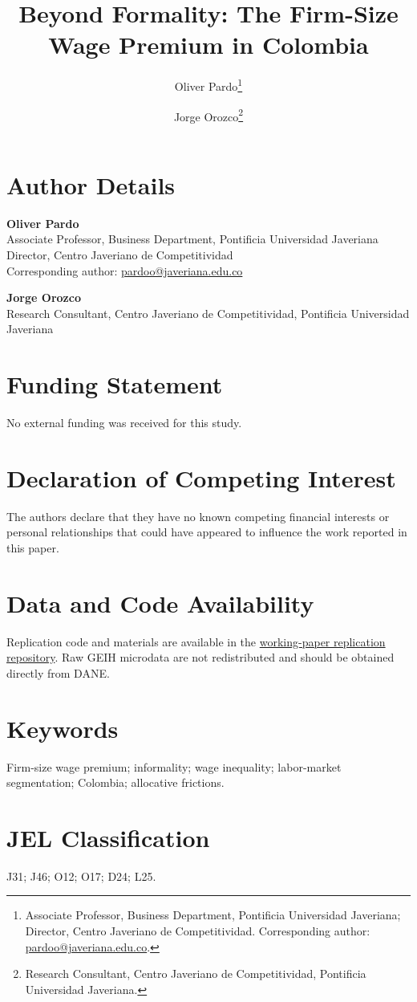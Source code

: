 \documentclass[12pt]{article}
\title{Beyond Formality: The Firm-Size Wage Premium in Colombia}
\author{
Oliver Pardo\thanks{Associate Professor, Business Department, Pontificia Universidad Javeriana; Director, Centro Javeriano de Competitividad. Corresponding author: \href{mailto:pardoo@javeriana.edu.co}{pardoo@javeriana.edu.co}.}
\and
Jorge Orozco\thanks{Research Consultant, Centro Javeriano de Competitividad, Pontificia Universidad Javeriana.}
}
\date{}
\begin{document}
\maketitle

\section*{Author Details}

\noindent\textbf{Oliver Pardo}\\
Associate Professor, Business Department, Pontificia Universidad Javeriana\\
Director, Centro Javeriano de Competitividad\\
Corresponding author: \href{mailto:pardoo@javeriana.edu.co}{pardoo@javeriana.edu.co}

\vspace{0.7cm}

\noindent\textbf{Jorge Orozco}\\
Research Consultant, Centro Javeriano de Competitividad, Pontificia Universidad Javeriana

\section*{Funding Statement}

No external funding was received for this study.

\section*{Declaration of Competing Interest}

The authors declare that they have no known competing financial interests or personal relationships that could have appeared to influence the work reported in this paper.

\section*{Data and Code Availability}

Replication code and materials are available in the
\href{https://github.com/Kin-George/CJC-Monitor/tree/working-paper-v1-2026-06-13}{working-paper replication repository}.
Raw GEIH microdata are not redistributed and should be obtained directly from DANE.

\section*{Keywords}

Firm-size wage premium; informality; wage inequality; labor-market segmentation; Colombia; allocative frictions.

\section*{JEL Classification}

J31; J46; O12; O17; D24; L25.
\end{document}
